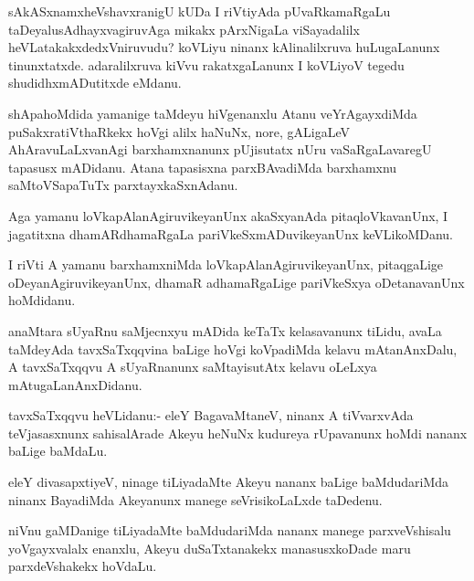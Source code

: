 \documentclass{article}
\begin{document}
\begin{mn}%
sAkASxnamxheVshavxranigU kUDa I riVtiyAda pUvaRkamaRgaLu
taDeyalusAdhayxvagiruvAga mikakx pArxNigaLa viSayadalilx
heVLatakakxdedxVniruvudu? koVLiyu ninanx kAlinalilxruva huLugaLanunx
tinunxtatxde. adaralilxruva kiVvu rakatxgaLanunx I koVLiyoV tegedu
shudidhxmADutitxde eMdanu.
\end{mn}

\begin{mn}%
shApahoMdida yamanige taMdeyu hiVgenanxlu Atanu veYrAgayxdiMda
puSakxratiVthaRkekx hoVgi alilx haNuNx, nore, gALigaLeV
AhAravuLaLxvanAgi barxhamxnanunx pUjisutatx nUru vaSaRgaLavaregU
tapasusx mADidanu. Atana tapasisxna parxBAvadiMda barxhamxnu
saMtoVSapaTuTx parxtayxkaSxnAdanu.
\end{mn}

\begin{mn}%
Aga yamanu loVkapAlanAgiruvikeyanUnx akaSxyanAda pitaqloVkavanUnx, I
jagatitxna dhamARdhamaRgaLa pariVkeSxmADuvikeyanUnx keVLikoMDanu.
\end{mn}

\begin{mn}
I riVti A yamanu barxhamxniMda loVkapAlanAgiruvikeyanUnx, pitaqgaLige
oDeyanAgiruvikeyanUnx, dhamaR adhamaRgaLige pariVkeSxya oDetanavanUnx hoMdidanu.
\end{mn}

\begin{mn}%
anaMtara sUyaRnu saMjecnxyu mADida keTaTx kelasavanunx tiLidu, avaLa
taMdeyAda tavxSaTxqqvina baLige hoVgi koVpadiMda kelavu mAtanAnxDalu,
A tavxSaTxqqvu A sUyaRnanunx saMtayisutAtx kelavu oLeLxya mAtugaLanAnxDidanu.
\end{mn}

\begin{mn}
tavxSaTxqqvu heVLidanu:- eleY BagavaMtaneV, ninanx A tiVvarxvAda
teVjasasxnunx sahisalArade Akeyu heNuNx kudureya rUpavanunx hoMdi
nananx baLige baMdaLu.
\end{mn}

\begin{mn}%
eleY divasapxtiyeV, ninage tiLiyadaMte Akeyu nananx baLige
baMdudariMda ninanx BayadiMda Akeyanunx manege seVrisikoLaLxde taDedenu.
\end{mn}

\begin{mn}
niVnu gaMDanige tiLiyadaMte baMdudariMda nananx manege parxveVshisalu
yoVgayxvalalx enanxlu, Akeyu duSaTxtanakekx manasusxkoDade maru
parxdeVshakekx hoVdaLu.
\end{mn}
\end{document}
